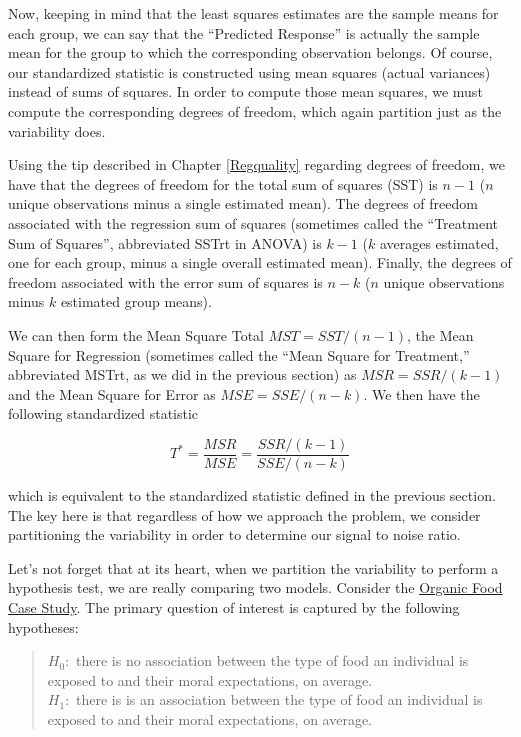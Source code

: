 \documentclass[]{book}
\theoremstyle{plain}
\theoremstyle{mydefn}
\theoremstyle{myexmpl}
\theoremstyle{remark}
\begin{document}
Now, keeping in mind that the least squares estimates are the sample
means for each group, we can say that the ``Predicted Response'' is
actually the sample mean for the group to which the corresponding
observation belongs. Of course, our standardized statistic is
constructed using mean squares (actual variances) instead of sums of
squares. In order to compute those mean squares, we must compute the
corresponding degrees of freedom, which again partition just as the
variability does.

Using the tip described in Chapter \ref{Regquality} regarding degrees of
freedom, we have that the degrees of freedom for the total sum of
squares (SST) is \(n - 1\) (\(n\) unique observations minus a single
estimated mean). The degrees of freedom associated with the regression
sum of squares (sometimes called the ``Treatment Sum of Squares'',
abbreviated SSTrt in ANOVA) is \(k - 1\) (\(k\) averages estimated, one
for each group, minus a single overall estimated mean). Finally, the
degrees of freedom associated with the error sum of squares is \(n - k\)
(\(n\) unique observations minus \(k\) estimated group means).

We can then form the Mean Square Total \(MST = SST/(n-1)\), the Mean
Square for Regression (sometimes called the ``Mean Square for
Treatment,'' abbreviated MSTrt, as we did in the previous section) as
\(MSR = SSR/(k-1)\) and the Mean Square for Error as
\(MSE = SSE/(n-k)\). We then have the following standardized statistic

\[T^* = \frac{MSR}{MSE} = \frac{SSR/(k-1)}{SSE/(n-k)}\]

which is equivalent to the standardized statistic defined in the
previous section. The key here is that regardless of how we approach the
problem, we consider partitioning the variability in order to determine
our signal to noise ratio.

Let's not forget that at its heart, when we partition the variability to
perform a hypothesis test, we are really comparing two models. Consider
the \protect\hyperlink{CaseOrganic}{Organic Food Case Study}. The
primary question of interest is captured by the following hypotheses:

\begin{quote}
\(H_0:\) there is no association between the type of food an individual
is exposed to and their moral expectations, on average.\\
\(H_1:\) there is is an association between the type of food an
individual is exposed to and their moral expectations, on average.
\end{quote}
\end{document}

